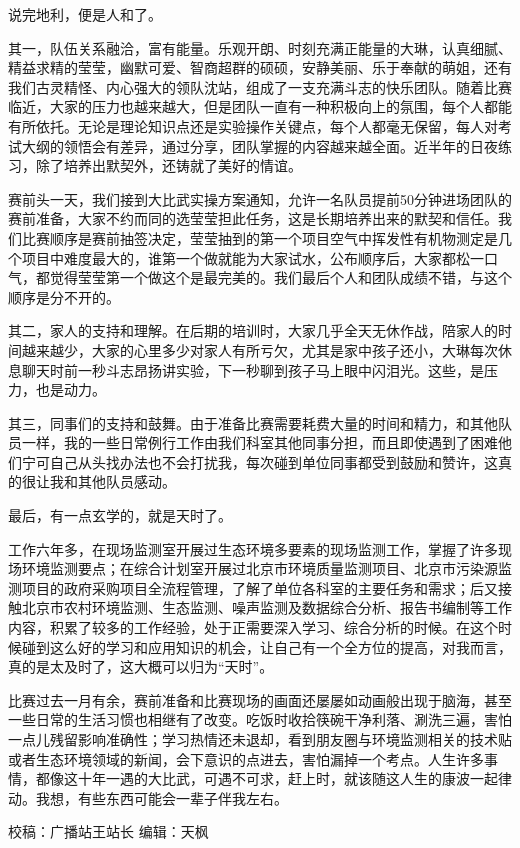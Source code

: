 \documentclass[
]{book}
\begin{document}
说完地利，便是人和了。

其一，队伍关系融洽，富有能量。乐观开朗、时刻充满正能量的大琳，认真细腻、精益求精的莹莹，幽默可爱、智商超群的硕硕，安静美丽、乐于奉献的萌姐，还有我们古灵精怪、内心强大的领队沈站，组成了一支充满斗志的快乐团队。随着比赛临近，大家的压力也越来越大，但是团队一直有一种积极向上的氛围，每个人都能有所依托。无论是理论知识点还是实验操作关键点，每个人都毫无保留，每人对考试大纲的领悟会有差异，通过分享，团队掌握的内容越来越全面。近半年的日夜练习，除了培养出默契外，还铸就了美好的情谊。

赛前头一天，我们接到大比武实操方案通知，允许一名队员提前50分钟进场团队的赛前准备，大家不约而同的选莹莹担此任务，这是长期培养出来的默契和信任。我们比赛顺序是赛前抽签决定，莹莹抽到的第一个项目空气中挥发性有机物测定是几个项目中难度最大的，谁第一个做就能为大家试水，公布顺序后，大家都松一口气，都觉得莹莹第一个做这个是最完美的。我们最后个人和团队成绩不错，与这个顺序是分不开的。

其二，家人的支持和理解。在后期的培训时，大家几乎全天无休作战，陪家人的时间越来越少，大家的心里多少对家人有所亏欠，尤其是家中孩子还小，大琳每次休息聊天时前一秒斗志昂扬讲实验，下一秒聊到孩子马上眼中闪泪光。这些，是压力，也是动力。

其三，同事们的支持和鼓舞。由于准备比赛需要耗费大量的时间和精力，和其他队员一样，我的一些日常例行工作由我们科室其他同事分担，而且即使遇到了困难他们宁可自己从头找办法也不会打扰我，每次碰到单位同事都受到鼓励和赞许，这真的很让我和其他队员感动。

最后，有一点玄学的，就是天时了。

工作六年多，在现场监测室开展过生态环境多要素的现场监测工作，掌握了许多现场环境监测要点；在综合计划室开展过北京市环境质量监测项目、北京市污染源监测项目的政府采购项目全流程管理，了解了单位各科室的主要任务和需求；后又接触北京市农村环境监测、生态监测、噪声监测及数据综合分析、报告书编制等工作内容，积累了较多的工作经验，处于正需要深入学习、综合分析的时候。在这个时候碰到这么好的学习和应用知识的机会，让自己有一个全方位的提高，对我而言，真的是太及时了，这大概可以归为``天时''。

比赛过去一月有余，赛前准备和比赛现场的画面还屡屡如动画般出现于脑海，甚至一些日常的生活习惯也相继有了改变。吃饭时收拾筷碗干净利落、涮洗三遍，害怕一点儿残留影响准确性；学习热情还未退却，看到朋友圈与环境监测相关的技术贴或者生态环境领域的新闻，会下意识的点进去，害怕漏掉一个考点。人生许多事情，都像这十年一遇的大比武，可遇不可求，赶上时，就该随这人生的康波一起律动。我想，有些东西可能会一辈子伴我左右。

校稿：广播站王站长
编辑：天枫
\end{document}
